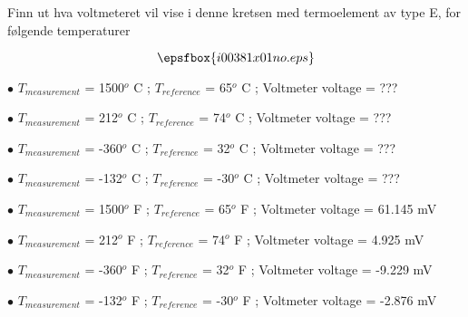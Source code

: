 


Finn ut hva voltmeteret vil vise i denne kretsen med termoelement av type E, for f{\o}lgende temperaturer

$$\epsfbox{i00381x01no.eps}$$

\medskip
\item{$\bullet$} $T_{measurement}$ = 1500$^{o}$ C ; $T_{reference}$ = 65$^{o}$ C ; Voltmeter voltage = ??? 
\item{$\bullet$} $T_{measurement}$ = 212$^{o}$ C ; $T_{reference}$ = 74$^{o}$ C ; Voltmeter voltage = ??? 
\item{$\bullet$} $T_{measurement}$ = -360$^{o}$ C ; $T_{reference}$ = 32$^{o}$ C ; Voltmeter voltage = ??? 
\item{$\bullet$} $T_{measurement}$ = -132$^{o}$ C ; $T_{reference}$ = -30$^{o}$ C ; Voltmeter voltage = ??? 
\medskip







\medskip
\item{$\bullet$} $T_{measurement}$ = 1500$^{o}$ F ; $T_{reference}$ = 65$^{o}$ F ; Voltmeter voltage = 61.145 mV 
\item{$\bullet$} $T_{measurement}$ = 212$^{o}$ F ; $T_{reference}$ = 74$^{o}$ F ; Voltmeter voltage = 4.925 mV 
\item{$\bullet$} $T_{measurement}$ = -360$^{o}$ F ; $T_{reference}$ = 32$^{o}$ F ; Voltmeter voltage = -9.229 mV 
\item{$\bullet$} $T_{measurement}$ = -132$^{o}$ F ; $T_{reference}$ = -30$^{o}$ F ; Voltmeter voltage = -2.876 mV 
\medskip











